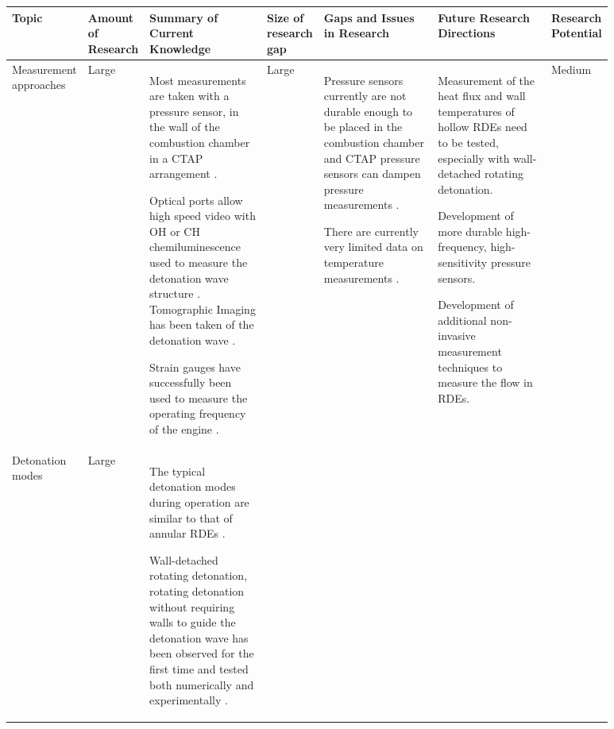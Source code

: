 \documentclass{article}
\begin{document}
\begin{landscape}
\begin{table}[ht]
	\centering
	\begin{tabular}{p{0.1\linewidth} | p{0.06\linewidth} | p{0.2\linewidth} | p{0.06\linewidth} | p{0.2\linewidth} | p{0.2\linewidth} | p{0.06\linewidth}}
		\toprule
		Topic     & Amount of Research    & Summary of Current Knowledge & Size of research gap & Gaps and Issues in Research & Future Research Directions & Research Potential\\
		\midrule
        Measurement approaches & \cellcolor[HTML]{D8E2DC}  Large &
        Most measurements are taken with a pressure sensor, in the wall of the combustion chamber in a CTAP arrangement \cite{Peng2022}.
        \par
        Optical ports allow high speed video with OH or CH chemiluminescence used to measure the detonation wave structure \cite{Peng2022}. Tomographic Imaging has been taken of the detonation wave \cite{Gaetano2021}.
        \par
        Strain gauges have successfully been used to measure the operating frequency of the engine \cite{Pritschau2022}.
        \par
        & \cellcolor[HTML]{D8E2DC} Large &
        Pressure sensors currently are not durable enough to be placed in the combustion chamber and CTAP pressure sensors can dampen pressure measurements \cite{Pritschau2022}.
        \par
        There are currently very limited data on temperature measurements \cite{Goto2020,Goto2022,Tian2022}.
        \par
        &  
        Measurement of the heat flux and wall temperatures of hollow RDEs need to be tested, especially with wall-detached rotating detonation.
        \par
        Development of more durable high-frequency, high-sensitivity pressure sensors.
        \par
        Development of additional non-invasive measurement techniques to measure the flow in RDEs.
        \par
        & \cellcolor[HTML]{FFE5D9} Medium\\
        \midrule
        Detonation modes & \cellcolor[HTML]{D8E2DC} Large &
        The typical detonation modes during operation are similar to that of annular RDEs \cite{Schwer2020,Schwer2021}.
        \par
        Wall-detached rotating detonation, rotating detonation without requiring walls to guide the detonation wave has been observed for the first time and tested both numerically and experimentally \cite{1Huang2023}.

\end{tabular}
\end{table}
\end{landscape}
\end{document}
